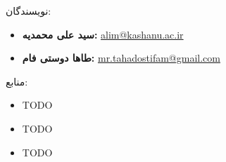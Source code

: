 \documentclass[b5paper,12pt]{article}
\begin{document}
		نویسندگان: 
		\begin{itemize}
			\item \textbf{سید علی محمدیه: } \href{mailto:alim@kashanu.ac.ir}{alim@kashanu.ac.ir}
			\item \textbf{طاها دوستی فام:} \href{mailto:mr.tahadostifam@gmail.com}{mr.tahadostifam@gmail.com}
		\end{itemize}		

		منابع:
		\begin{itemize}
			\item TODO
			\item TODO
			\item TODO
		\end{itemize}		
\end{document}
